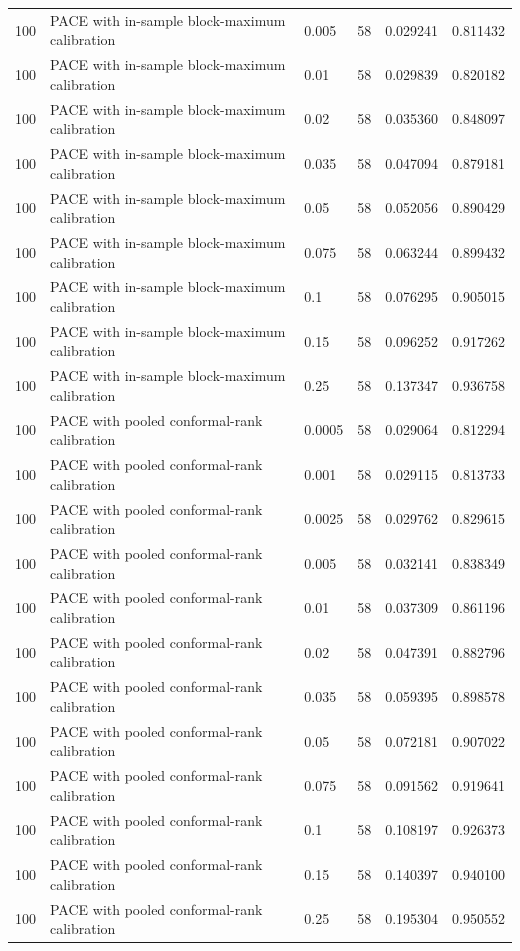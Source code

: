 \begin{tabular}{llllll}
100 & PACE with in-sample block-maximum calibration & 0.005 & 58 & 0.029241 & 0.811432 \\
100 & PACE with in-sample block-maximum calibration & 0.01 & 58 & 0.029839 & 0.820182 \\
100 & PACE with in-sample block-maximum calibration & 0.02 & 58 & 0.035360 & 0.848097 \\
100 & PACE with in-sample block-maximum calibration & 0.035 & 58 & 0.047094 & 0.879181 \\
100 & PACE with in-sample block-maximum calibration & 0.05 & 58 & 0.052056 & 0.890429 \\
100 & PACE with in-sample block-maximum calibration & 0.075 & 58 & 0.063244 & 0.899432 \\
100 & PACE with in-sample block-maximum calibration & 0.1 & 58 & 0.076295 & 0.905015 \\
100 & PACE with in-sample block-maximum calibration & 0.15 & 58 & 0.096252 & 0.917262 \\
100 & PACE with in-sample block-maximum calibration & 0.25 & 58 & 0.137347 & 0.936758 \\
100 & PACE with pooled conformal-rank calibration & 0.0005 & 58 & 0.029064 & 0.812294 \\
100 & PACE with pooled conformal-rank calibration & 0.001 & 58 & 0.029115 & 0.813733 \\
100 & PACE with pooled conformal-rank calibration & 0.0025 & 58 & 0.029762 & 0.829615 \\
100 & PACE with pooled conformal-rank calibration & 0.005 & 58 & 0.032141 & 0.838349 \\
100 & PACE with pooled conformal-rank calibration & 0.01 & 58 & 0.037309 & 0.861196 \\
100 & PACE with pooled conformal-rank calibration & 0.02 & 58 & 0.047391 & 0.882796 \\
100 & PACE with pooled conformal-rank calibration & 0.035 & 58 & 0.059395 & 0.898578 \\
100 & PACE with pooled conformal-rank calibration & 0.05 & 58 & 0.072181 & 0.907022 \\
100 & PACE with pooled conformal-rank calibration & 0.075 & 58 & 0.091562 & 0.919641 \\
100 & PACE with pooled conformal-rank calibration & 0.1 & 58 & 0.108197 & 0.926373 \\
100 & PACE with pooled conformal-rank calibration & 0.15 & 58 & 0.140397 & 0.940100 \\
100 & PACE with pooled conformal-rank calibration & 0.25 & 58 & 0.195304 & 0.950552 \\

\end{tabular}
